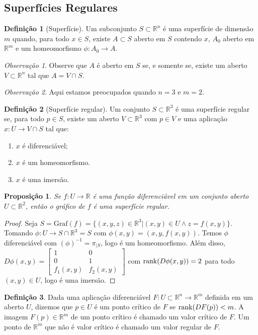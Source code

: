 \documentclass{article}
\newtheorem{prop}{Proposição}[section]
\theoremstyle{theorem}
\theoremstyle{lemma}
\theoremstyle{definition}
\newtheorem{definicao}{Definição}[section]
\theoremstyle{remark}
\newtheorem{obs}{Observação}[section]
\begin{document}
\subsection{Superfícies Regulares}
\begin{definicao}[Superfície]
	Um subconjunto $S\subset \mathbb{R}^n$ é uma superfície de dimensão $m$ quando, para todo $x\in S$, existe $A \subset S$ aberto em $S$ contendo $x$, $A_0$ aberto em $\mathbb{R}^m$ e um homeomorfismo $\phi: A_0 \to A$.
\end{definicao}
\begin{obs}
	Observe que $A$ é aberto em $S$ se, e somente se, existe um aberto $V\subset \mathbb{R}^n$ tal que $A = V\cap S$.
\end{obs}
\begin{obs}
	Aqui estamos preocupados quando $n = 3$ e $m = 2$.
\end{obs}
\begin{definicao}[Superfície regular]
	Um conjunto $S\subset \mathbb{R}^3$ é uma superfície regular se, para todo $p\in S$, existe um aberto $V\subset \mathbb{R}^3$ com $p\in V$ e uma aplicação $x: U \to V\cap S$ tal que:
	\begin{enumerate}
		\item $x$ é diferenciável;
		\item $x$ é um homeomorfismo.
		\item $x$ é uma imersão.
	\end{enumerate}
\end{definicao}

\begin{prop}
	Se $f:U\to \mathbb{R}$ é uma função diferenciável em um conjunto aberto $U\subset \mathbb{R}^2$, então o gráfico de $f$ é uma superfície regular.
\end{prop}

\begin{proof}
	Seja $S = \text{Graf}(f) = \{ (x,y,z) \in \mathbb{R}^3 | (x,y) \in U \land z = f(x,y) \}$. Tomando $\phi: U \to S\cap \mathbb{R}^3 = S$ com $\phi(x,y) = (x,y, f(x,y))$. Temos $\phi$ diferenciável com $(\phi)^{-1} = \pi_{|S}$, logo é um homeomorfismo. Além disso, $D\phi(x,y) = \begin{bmatrix} 1 & 0 \\ 0 & 1 \\ f_1(x,y) & f_2(x,y) \end{bmatrix}$ com $\rank(D\phi(x,y)) = 2$ para todo $(x,y) \in U$, logo é uma imersão.
\end{proof}
\begin{definicao}
	Dada uma aplicação diferenciável $F: U \subset \mathbb{R}^n \to \mathbb{R}^m$ definida em um aberto $U$, dizemos que $p\in U$ é um ponto crítico de $F$ se $\rank(DF(p)) < m$. A imagem $F(p) \in \mathbb{R}^m$ de um ponto crítico é chamado um valor crítico de $F$. Um ponto de $\mathbb{R}^m$ que não é valor crítico é chamado um valor regular de $F$.
\end{definicao}
\end{document}
